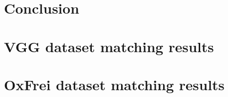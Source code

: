\documentclass[a4paper,11pt]{article}
\begin{document}
\section{Conclusion}





\appendix

\section{VGG dataset matching results }



\section{OxFrei dataset matching results }






\end{document}
